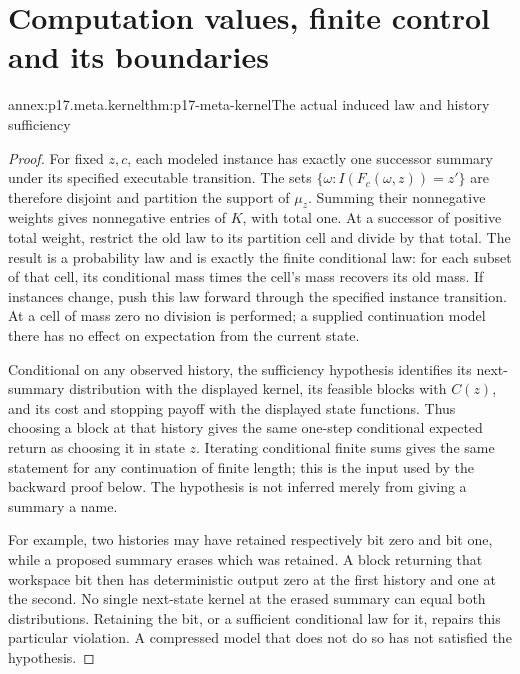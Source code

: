 \section{Computation values, finite control and its boundaries}

\begin{annexitem}{annex:p17.meta.kernel}{thm:p17-meta-kernel}{The actual induced law and history sufficiency}
\begin{proof}
For fixed \(z,c\), each modeled instance has exactly one successor
summary under its specified executable transition. The sets
\(\{\omega:I(F_c(\omega,z))=z'\}\) are therefore disjoint and
partition the support of \(\mu_z\). Summing their nonnegative
weights gives nonnegative entries of \(K\), with total one.
At a successor of positive total weight, restrict the old law to
its partition cell and divide by that total. The result is a
probability law and is exactly the finite conditional law: for
each subset of that cell, its conditional mass times the cell's
mass recovers its old mass. If instances change, push this law
forward through the specified instance transition. At a cell of
mass zero no division is performed; a supplied continuation model
there has no effect on expectation from the current state.

Conditional on any observed history, the sufficiency hypothesis
identifies its next-summary distribution with the displayed kernel,
its feasible blocks with \(C(z)\), and its cost and stopping
payoff with the displayed state functions. Thus choosing a block
at that history gives the same one-step conditional expected
return as choosing it in state \(z\). Iterating conditional
finite sums gives the same statement for any continuation of
finite length; this is the input used by the backward proof below.
The hypothesis is not inferred merely from giving a summary a name.

For example, two histories may have retained respectively bit zero
and bit one, while a proposed summary erases which was retained.
A block returning that workspace bit then has deterministic output
zero at the first history and one at the second. No single next-state
kernel at the erased summary can equal both distributions. Retaining
the bit, or a sufficient conditional law for it, repairs this
particular violation. A compressed model that does not do so has
not satisfied the hypothesis.
\end{proof}
\end{annexitem}

